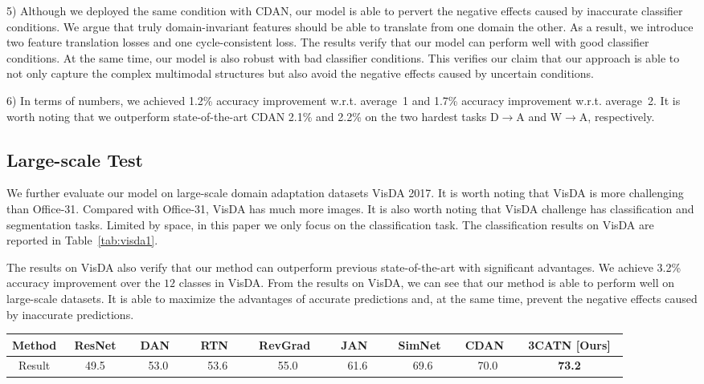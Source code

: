 \documentclass[sigconf]{acmart}
\begin{document}
5) Although we deployed the same condition with CDAN, our model is able to pervert the negative effects caused by inaccurate classifier conditions. We argue that truly domain-invariant features should be able to translate from one domain the other. As a result, we introduce two feature translation losses and one cycle-consistent loss. The results verify that our model can perform well with good classifier conditions. At the same time, our model is also robust with bad classifier conditions. This verifies our claim that our approach is able to not only capture the complex multimodal structures but also avoid the negative effects caused by uncertain conditions.

6) In terms of numbers, we achieved 1.2\% accuracy improvement w.r.t. average~1 and 1.7\% accuracy improvement w.r.t. average~2. It is worth noting that we outperform state-of-the-art CDAN 2.1\% and 2.2\% on the two hardest tasks D$\rightarrow$A and W$\rightarrow$A, respectively. 


\subsection{Large-scale Test}
We further evaluate our model on large-scale domain adaptation datasets VisDA 2017. It is worth noting that VisDA is more challenging than Office-31. Compared with Office-31, VisDA has much more images. It is also worth noting that VisDA challenge has classification and segmentation tasks. Limited by space, in this paper we only focus on the classification task. The classification results on VisDA are reported in Table~\ref{tab:visda1}.




The results on VisDA also verify that our method can outperform previous state-of-the-art with significant advantages. We achieve 3.2\% accuracy improvement over the $12$ classes in VisDA. From the results on VisDA, we can see that our method is able to perform well on large-scale datasets. It is able to maximize the advantages of accurate predictions and, at the same time, prevent the negative effects caused by inaccurate predictions. 



\begin{table*}[ht!p]
\centering
\caption{Domain adaptation results (accuracy~\%) on VisDA-2017 dataset. All of the base networks are ResNet-50. }
\vspace{-8pt}
\label{tab:visda1}
\begin{tabular}{ccccccccc}
\toprule
Method & ~ResNet\cite{he2016deep}~ & ~DAN~\cite{long2015learning}~ & ~RTN~\cite{long2016unsupervised}~ & ~RevGrad~\cite{ganin2016domain}~  & ~JAN~\cite{long2017deep}~ & ~SimNet~\cite{pinheiro2018unsupervised}~ & CDAN~\cite{long2018conditional} & ~3CATN [Ours]~\\
\midrule
Result & 49.5 & 53.0 & 53.6 & 55.0  & 61.6 & 69.6 & 70.0 & {\bf 73.2} \\ 
\bottomrule
\end{tabular}
\end{table*}
\end{document}
